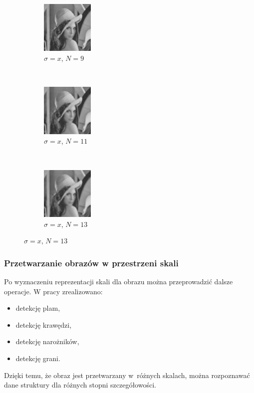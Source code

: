 \begin{frame}
\begin{figure}[h]
\begin{center}
			\begin{subfigure}[b]{2.5cm}
				\centering
				\includegraphics[width=2.5cm]{Lena_scales4.jpg}
				\caption{$\sigma = x$, $N = 9$}
			\end{subfigure}
			~
			\begin{subfigure}[b]{2.5cm}
				\centering
				\includegraphics[width=2.5cm]{Lena_scales5.jpg}
				\caption{$\sigma = x$, $N = 11$}
			\end{subfigure}
			~
			\begin{subfigure}[b]{2.5cm}
				\centering
				\includegraphics[width=2.5cm]{Lena_scales6.jpg}
				\caption{$\sigma = x$, $N = 13$}
			\end{subfigure}
			\label{lena_scales}
		\end{center}
	\end{figure}
\end{frame}


\begin{frame}
	\frametitle{Przetwarzanie obrazów w przestrzeni skali}

	Po wyznaczeniu reprezentacji skali dla obrazu można przeprowadzić dalsze operacje. W pracy zrealizowano:
	\begin{itemize}
		\item detekcję plam,
		\item detekcję krawędzi,
		\item detekcję narożników,
		\item detekcję grani.
	\end{itemize}
	Dzięki temu, że obraz jest przetwarzany w~różnych skalach, można rozpoznawać dane struktury dla różnych stopni szczegółowości.
\end{frame}


